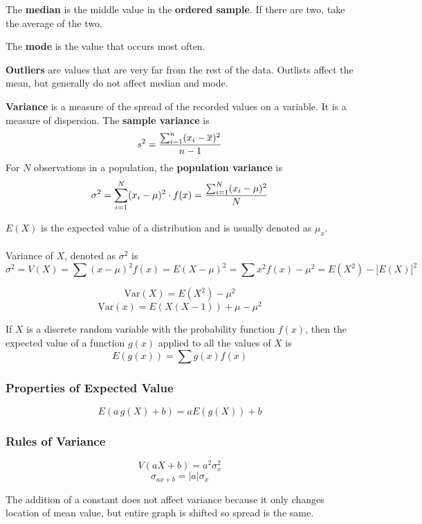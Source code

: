 \documentclass[english, 12pt]{article}
\begin{document}
\begin{defn}
The \textbf{median} is the middle value in the \textbf{ordered sample}. If there are two, take the average of the two.
\end{defn}

\begin{defn}
The \textbf{mode} is the value that occurs most often.
\end{defn}

\begin{defn}
\textbf{Outliers} are values that are very far from the rest of the data. Outlists affect the mean, but generally do not affect median and mode.
\end{defn}

\begin{defn}
\textbf{Variance} is a measure of the spread of the recorded values on a variable. It is a measure of dispersion. The \textbf{sample variance} is
\[ s^2 = \frac{\sum_{i=1}^n (x_{i}- \overline{x})^2}{n-1}\]
For $N$ observations in a population, the \textbf{population variance} is
\[\sigma^2 = \sum_{i=1}^N (x_{i} - \mu)^2 \cdot f(x) = \frac{\sum_{i=1}^N (x_{i} - \mu)^2}{N}\]
\end{defn}

\begin{defn}
$E(X)$ is the expected value of a distribution and is usually denoted as $\mu_{x}$.\\\\
Variance of $X$, denoted as $\sigma^2$ is
\[\sigma^2 = V(X) = \sum (x-\mu)^2 f(x) = E(X- \mu)^2 = \sum x^2 f(x) - \mu^2 = E(X^2) - \lbrack E(X) \rbrack ^2\]
\end{defn}
\[\text{Var} (X) = E(X^2) - \mu ^2\]
\[\text{Var}(x) = E(X(X-1)) + \mu - \mu^2\]

If $X$ is a discrete random variable with the probability function $f(x)$, then the expected value of a function $g(x)$ applied to all the values of $X$ is
\[E(g(x)) = \sum g(x) f(x)\]
\subsubsection*{Properties of Expected Value}
\[E(a\,g(X) + b) = a E(g(X)) + b\]
\subsubsection*{Rules of Variance}
\[V(aX + b) = a^2 \sigma^2_{x}\]
\[\sigma_{ax+b} = |a| \sigma_{x}\]

\begin{note}
The addition of a constant does not affect variance because it only changes location of mean value, but entire graph is shifted so spread is the same.
\end{note}
\end{document}
